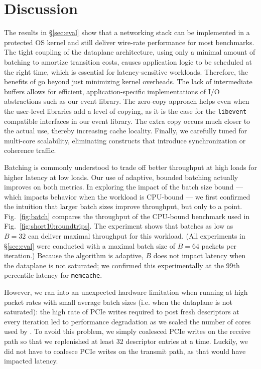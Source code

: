 
\section{Discussion}
\label{sec:disc}


 The results in \S\ref{sec:eval}
show that a networking stack can be implemented in a protected OS
kernel and still deliver wire-rate performance for most benchmarks.
The tight coupling of the dataplane architecture, using only a minimal
amount of batching to amortize transition costs, causes application
logic to be scheduled at the right time, which is essential for
latency-sensitive workloads.  Therefore, the benefits of \ix go beyond
just minimizing kernel overheads. The lack of intermediate buffers
allows for efficient, application-specific implementations of I/O
abstractions such as our event library. The zero-copy approach helps
even when the user-level libraries add a level of copying, as it is
the case for the \texttt{libevent} compatible interfaces in our event
library.  The extra copy occurs much closer to the actual use, thereby
increasing cache locality.  Finally, we carefully tuned \ix for
multi-core scalability, eliminating constructs that introduce
synchronization or coherence traffic.





Batching is commonly understood to trade off better throughput at high
loads for higher latency at low loads.  Our use of adaptive, bounded
batching actually improves on both metrics. In exploring the impact of
the batch size bound --- which impacts behavior when the workload is
CPU-bound --- we first confirmed the intuition that larger batch
sizes improve throughput, but only to a point. Fig.~\ref{fig:batch}
compares the throughput of the CPU-bound benchmark used in
Fig.~\ref{fig:short10:roundtrips}.  The experiment shows that batches
as low as $B=32$ can deliver maximal throughput for this
workload. (All experiments in \S\ref{sec:eval} were conducted with a
maximal batch size of $B=64$ packets per iteration.)  Because the
algorithm is adaptive, $B$ does not impact latency when the dataplane
is not saturated; we confirmed
this experimentally at the 99th percentile latency for
\texttt{memcache}.

However, we ran into an unexpected hardware limitation
when running \ix at high packet rates with small average batch sizes 
(i.e. when the dataplane is not saturated): 
the high rate of PCIe writes required to post fresh
descriptors at every iteration led to performance degradation as we
scaled the number of cores used by \ix.  To avoid this problem, we
simply coalesced PCIe writes on the receive path so that we
replenished at least 32 descriptor entries at a time.  Luckily, we did
not have to coalesce PCIe writes on the transmit path, as that would
have impacted latency.


